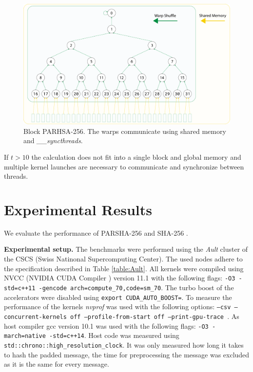 \documentclass[letterpaper]{article}
\newcommand{\mypar}[1]{{\bf #1.}}
\begin{document}
\begin{figure}[t]\centering
\includegraphics[scale=0.125]{block2.pdf}
  \caption{Block PARHSA-256. The warps communicate using shared memory and \emph{\_\_syncthreads}. \label{fig:block}}
\end{figure}

If $t > 10$ the calculation does not fit into a single block and global memory and multiple kernel launches are necessary to communicate and synchronize between threads.









\section{Experimental Results}\label{sec:exp}
We evaluate the performance of PARSHA-256 and SHA-256 . 

\mypar{Experimental setup} The benchmarks were performed using the \emph{Ault} cluster of the CSCS (Swiss Natinonal Supercomputing Center). The used nodes adhere to the specification described in Table \ref{table:Ault}.
All kernels were compiled using NVCC (NVIDIA CUDA Compiler \cite{nvcc}) version 11.1 with the following flags: \texttt{-O3 -std=c++11 -gen\-code arch=compute\_70,code=sm\_70}.
The  turbo  boost  of  the  accelerators  were  disabled  using \texttt{export \- CUDA\-\_\-AUTO\-\_\-BOOST\-=}.
To measure the performance of the kernels \emph{nvprof} \cite{nvprof} was used with the following options: \texttt{--csv --con\-current-\-kernels off  --profile\--from\--start off --print\--gpu\--trace }. As host compiler gcc \cite{gcc} version 10.1 was used with the following flags: \texttt{-O3 -march=native -std=c++14}. Host code was measured using \texttt{std\-::\-chrono\-::\-high\-\_\-re\-so\-lu\-ti\-on\-\-\_\-clock}. 
It was only measured how long it takes to hash the padded message, the time for preprocessing the message was excluded as it is the same for every message.
\end{document}
